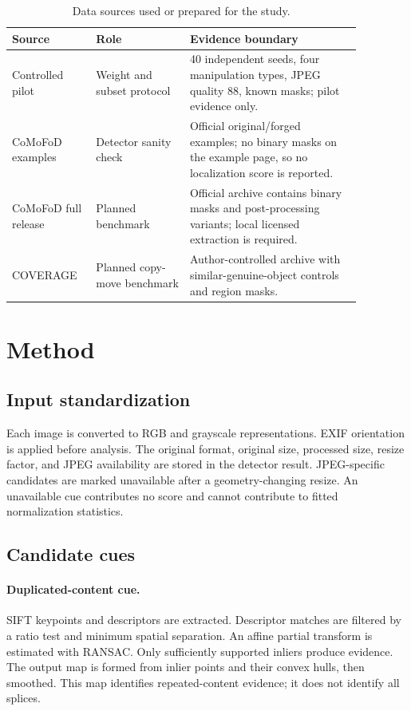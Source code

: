 \documentclass[sigconf,nonacm]{acmart}
\begin{document}
\begin{table}[t]
\caption{Data sources used or prepared for the study.}\label{tab:data}\small
\begin{tabular}{p{0.19\linewidth}p{0.24\linewidth}p{0.44\linewidth}}
\toprule Source & Role & Evidence boundary \\
\midrule
Controlled pilot & Weight and subset protocol & 40 independent seeds, four manipulation types, JPEG quality 88, known masks; pilot evidence only. \\
CoMoFoD examples & Detector sanity check & Official original/forged examples; no binary masks on the example page, so no localization score is reported. \\
CoMoFoD full release & Planned benchmark & Official archive contains binary masks and post-processing variants; local licensed extraction is required. \\
COVERAGE & Planned copy-move benchmark & Author-controlled archive with similar-genuine-object controls and region masks. \\
\bottomrule
\end{tabular}
\end{table}

\section{Method}
\subsection{Input standardization}
Each image is converted to RGB and grayscale representations. EXIF orientation is applied before analysis. The original format, original size, processed size, resize factor, and JPEG availability are stored in the detector result. JPEG-specific candidates are marked unavailable after a geometry-changing resize. An unavailable cue contributes no score and cannot contribute to fitted normalization statistics.

\subsection{Candidate cues}
\paragraph{Duplicated-content cue.} SIFT keypoints and descriptors are extracted. Descriptor matches are filtered by a ratio test and minimum spatial separation. An affine partial transform is estimated with RANSAC. Only sufficiently supported inliers produce evidence. The output map is formed from inlier points and their convex hulls, then smoothed. This map identifies repeated-content evidence; it does not identify all splices.
\end{document}
